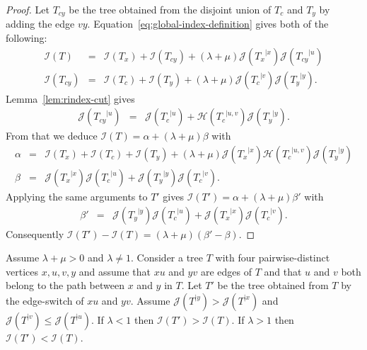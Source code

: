 \documentclass[11 pt]{modarticle}
\newcommand{\rtree}[2]{{#1}^{\lvert #2}}
\newcommand{\indexsymbol}{\mathcal{I}}
\newcommand{\tindex}[1]{\indexsymbol(#1)}
\newcommand{\rindexsymbol}{\mathcal{J}}
\newcommand{\rindex}[2]{\rindexsymbol(\rtree{#2}{#1})}
\newcommand{\aindexsymbol}{\mathcal{H}}
\newcommand{\aindex}[3]{\aindexsymbol(\rtree{#3}{#1, #2})}
\begin{document}
\begin{proof}
Let $T_{cy}$ be the tree obtained from the disjoint union of $T_c$ and $T_y$ by adding the edge $vy$. Equation~\eqref{eq:global-index-definition} gives both of the following:
\begin{eqnarray*}
	\tindex{T} & = & \tindex{T_x} + \tindex{T_{cy}} + (\lambda + \mu) \rindex{x}{T_x} \rindex{u}{T_{cy}} \\
	\tindex{T_{cy}} & = & \tindex{T_c} + \tindex{T_y} + (\lambda + \mu) \rindex{v}{T_c} \rindex{y}{T_y}.
\end{eqnarray*}
Lemma~\ref{lem:rindex-cut} gives
\begin{eqnarray*}
	\rindex{u}{T_{cy}} & = & \rindex{u}{T_c} + \aindex{u}{v}{T_c} \rindex{y}{T_y}.
\end{eqnarray*}
From that we deduce $\tindex{T} = \alpha + (\lambda + \mu) \beta$ with
\begin{eqnarray*}
	\alpha & = & \tindex{T_x} + \tindex{T_c} + \tindex{T_y} + (\lambda + \mu) \rindex{x}{T_x} \aindex{u}{v}{T_c} \rindex{y}{T_y} \\
	\beta & = & \rindex{x}{T_x}\rindex{u}{T_c} + \rindex{y}{T_y}\rindex{v}{T_c}.
\end{eqnarray*}
Applying the same arguments to $T'$ gives $\tindex{T'} = \alpha + (\lambda + \mu)\beta'$ with
\begin{eqnarray*}
	\beta' & = & \rindex{y}{T_y}\rindex{u}{T_c} + \rindex{x}{T_x}\rindex{v}{T_c}.
\end{eqnarray*}
Consequently $\tindex{T'} - \tindex{T} = (\lambda + \mu)(\beta' - \beta)$.
\end{proof}

\begin{prop}\label{prop:compacity-exchange}
Assume $\lambda + \mu > 0$ and $\lambda \neq 1$. Consider a tree $T$ with four pairwise-distinct vertices $x,u,v,y$ and assume that $xu$ and $yv$ are edges of $T$ and that $u$ and $v$ both belong to the path between $x$ and $y$ in $T$. Let $T'$ be the tree obtained from $T$ by the edge-switch of $xu$ and $yv$. Assume $\rindex{y}{T} > \rindex{x}{T}$ and $\rindex{v}{T} \leq \rindex{u}{T}$. If $\lambda < 1$ then $\tindex{T'} > \tindex{T}$. If $\lambda > 1$ then $\tindex{T'} < \tindex{T}$.
\end{prop}
\end{document}
